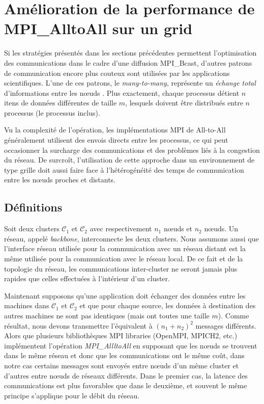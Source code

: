 \section{Amélioration de la performance de MPI\_AlltoAll sur un grid}

Si les stratégies présentés dans les sections précédentes permettent l'optimisation des communications dans le cadre d'une diffusion MPI\_Bcast, d'autres patrons de communication encore plus couteux sont utilisées par les applications scientifiques. L'une de ces patrons, le \textit{many-to-many}, représente un \emph{échange total} d'informations entre les n{\oe}uds \cite{Christara99}. Plus exactement, chaque processus détient $n$ itens de données différentes de taille $m$, lesquels doivent être distribués entre $n$ processus (le processus inclus).  

Vu la complexité de l'opération, les implémentations MPI de All-to-All généralement utilisent des envois directs entre les processus, ce qui peut occasionner la surcharge des communications et des problèmes liés à la congestion du réseau. De surcroît, l'utilisation de cette approche dans un environnement de type grille doit aussi faire face à l'hétérogénéité des temps de communication entre les n{\oe}uds proches et distants.

\subsection{Définitions}

Soit deux clusters ${\mathcal C}_1$
et ${\mathcal C}_2$ avec respectivement $n_1$ n{\oe}uds et $n_2$ n{\oe}uds.
Un réseau, appelé \textit{backbone}, interconnecte les deux clusters. Nous assumons aussi que l'interface réseau utilisée pour la communication avec un réseau distant est la même utilisée pour la communication avec le réseau local. De ce fait et de la topologie du réseau, les communications inter-cluster ne seront jamais plus rapides que celles effectuées à l'intérieur d'un cluster.

Maintenant supposons qu'une application doit échanger des données entre les machines dans ${\mathcal C}_1$ et ${\mathcal C}_2$ et que pour chaque source, les données à destination des autres machines ne sont pas identiques (mais ont toutes une taille $m$).  Comme résultat, nous devons transmettre l'équivalent à $(n_1+ n_2)^2$ messages différents. Alors que plusieurs bibliothèques MPI libraries  (OpenMPI, MPICH2, etc.) implémentent l'opération \textit{MPI\_AllltoAll} en supposant que les n{\oe}uds se trouvent dans le même réseau et donc que les communications ont le même coût, dans notre cas certains messages sont envoyés entre n{\oe}uds d'un même cluster et d'autres entre n{\oe}uds de réseaux différents. Dans le premier cas, la latence des communications est plus favorables que dans le deuxième, et souvent le même principe s'applique pour le débit du réseau.


